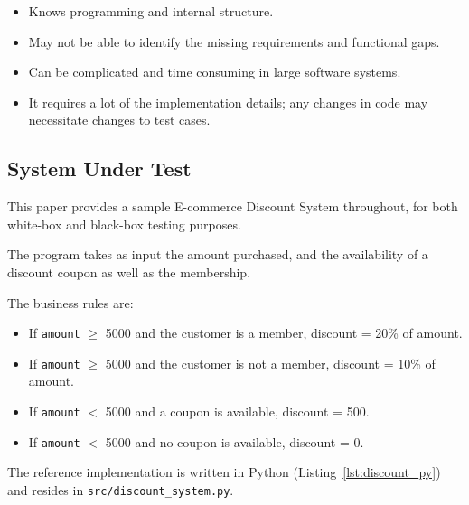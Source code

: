 \documentclass[conference]{IEEEtran}
\begin{document}
\begin{itemize}

\item Knows programming and internal structure.

\item May not be able to identify the missing requirements and functional gaps.

\item Can be complicated and time consuming in large software systems.

\item It requires a lot of the implementation details; any changes in code may necessitate changes to test cases.

\end{itemize}



\subsection{System Under Test}

\label{sec:sut}

This paper provides a sample E-commerce Discount System throughout, for both white-box and black-box testing purposes.

The program takes as input the amount purchased, and the availability of a discount coupon as well as the membership.

The business rules are:



\begin{itemize}

\item If \texttt{amount} $\geq$ 5000 and the customer is a member, discount = 20\% of amount.

\item If \texttt{amount} $\geq$ 5000 and the customer is not a member, discount = 10\% of amount.

\item If \texttt{amount} $<$ 5000 and a coupon is available, discount = 500.

\item If \texttt{amount} $<$ 5000 and no coupon is available, discount = 0.

\end{itemize}



The reference implementation is written in Python (Listing~\ref{lst:discount_py}) and resides in \texttt{src/discount\_system.py}.
\end{document}
